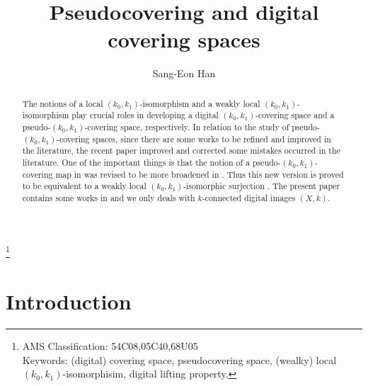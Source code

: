 \documentclass[J,12pt]{amsart}
\begin{document}
\title[Remarks on pseudocovering spaces]{Pseudocovering and digital covering spaces}
\author[label1]{Sang-Eon Han}
\address[label1]{Department of Mathematics Education, Institute of Pure and Applied Mathematics\\
	Jeonbuk National University, Jeonju-City Jeonbuk, 54896, Republic of Korea\\
	e-mail address:sehan@jbnu.ac.kr, Tel: 82-63-270-4449.}
\thanks {AMS Classification: 54C08,05C40,68U05\\
	Keywords: (digital) covering space,  pseudocovering space, (wealky) local $(k_0,k_1)$-isomorphisim, digital lifting property.}


\begin{abstract} The notions of a local $(k_0,k_1)$-isomorphism and a weakly local $(k_0,k_1)$-isomorphism play crucial roles in 
	developing a digital $(k_0,k_1)$-covering space and a pseudo-$(k_0,k_1)$-covering space, respectively.
	In relation to the study of pseudo-$(k_0,k_1)$-covering spaces, since there are some works to be refined and improved in the literature, 
	the recent paper \cite{H10}
	improved and corrected some mistakes occurred in the literature.
	One of the important things is that the notion of a pseudo-$(k_0,k_1)$-covering map in \cite{H6,H9} was revised to be more broadened in \cite{H10}.
	Thus this new version is proved to be equivalent to a weakly local $(k_0,k_1)$-isomorphic surjection \cite{H10}. The present paper contains some works in \cite{H10} and
	we  only deals with $k$-connected digital images $(X, k)$.
\end{abstract}


\maketitle

\newpage

\section{\bf Introduction}\label{s1}
\end{document}
